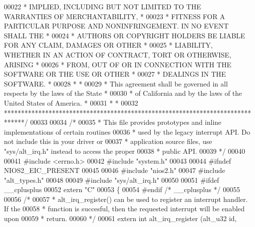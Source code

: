 \begin{DoxyCode}
00022 \textcolor{comment}{* IMPLIED, INCLUDING BUT NOT LIMITED TO THE WARRANTIES OF MERCHANTABILITY,    *}
00023 \textcolor{comment}{* FITNESS FOR A PARTICULAR PURPOSE AND NONINFRINGEMENT. IN NO EVENT SHALL THE *}
00024 \textcolor{comment}{* AUTHORS OR COPYRIGHT HOLDERS BE LIABLE FOR ANY CLAIM, DAMAGES OR OTHER      *}
00025 \textcolor{comment}{* LIABILITY, WHETHER IN AN ACTION OF CONTRACT, TORT OR OTHERWISE, ARISING     *}
00026 \textcolor{comment}{* FROM, OUT OF OR IN CONNECTION WITH THE SOFTWARE OR THE USE OR OTHER         *}
00027 \textcolor{comment}{* DEALINGS IN THE SOFTWARE.                                                   *}
00028 \textcolor{comment}{*                                                                             *}
00029 \textcolor{comment}{* This agreement shall be governed in all respects by the laws of the State   *}
00030 \textcolor{comment}{* of California and by the laws of the United States of America.              *}
00031 \textcolor{comment}{*                                                                             *}
00032 \textcolor{comment}{******************************************************************************/}
00033 
00034 \textcolor{comment}{/*}
00035 \textcolor{comment}{ * This file provides prototypes and inline implementations of certain routines}
00036 \textcolor{comment}{ * used by the legacy interrupt API. Do not include this in your driver or }
00037 \textcolor{comment}{ * application source files, use "sys/alt\_irq.h" instead to access the proper}
00038 \textcolor{comment}{ * public API.}
00039 \textcolor{comment}{ */}
00040  
00041 \textcolor{preprocessor}{#include <errno.h>}
00042 \textcolor{preprocessor}{#include "system.h"}
00043 
00044 \textcolor{preprocessor}{#ifndef NIOS2\_EIC\_PRESENT}
00045 
00046 \textcolor{preprocessor}{#include "nios2.h"}
00047 \textcolor{preprocessor}{#include "alt_types.h"}
00048 
00049 \textcolor{preprocessor}{#include "sys/alt_irq.h"}
00050 
00051 \textcolor{preprocessor}{#ifdef \_\_cplusplus}
00052 \textcolor{keyword}{extern} \textcolor{stringliteral}{"C"}
00053 \{
00054 \textcolor{preprocessor}{#endif }\textcolor{comment}{/* \_\_cplusplus */}\textcolor{preprocessor}{}
00055 
00056 \textcolor{comment}{/*}
00057 \textcolor{comment}{ * alt\_irq\_register() can be used to register an interrupt handler. If the }
00058 \textcolor{comment}{ * function is succesful, then the requested interrupt will be enabled upon }
00059 \textcolor{comment}{ * return.}
00060 \textcolor{comment}{ */}
00061 \textcolor{keyword}{extern} \textcolor{keywordtype}{int} alt_irq_register (alt_u32 \textcolor{keywordtype}{id}, 

\end{DoxyCode}
